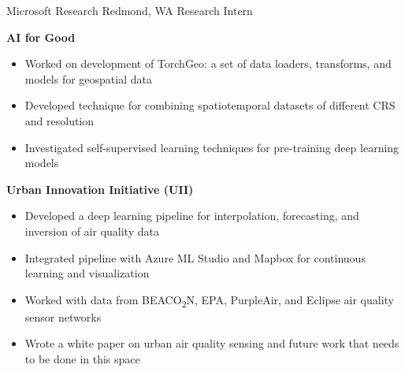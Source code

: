 
        {Microsoft Research}
        {Redmond, WA}
        {Research Intern}
        {}{
    \textbf{AI for Good}
    \begin{itemize}
        \item Worked on development of TorchGeo: a set of data loaders, transforms, and models for geospatial data
        \item Developed technique for combining spatiotemporal datasets of different CRS and resolution
        \item Investigated self-supervised learning techniques for pre-training deep learning models
    \end{itemize}
    \textbf{Urban Innovation Initiative (UII)}
    \begin{itemize}
        \item Developed a deep learning pipeline for interpolation, forecasting, and inversion of air quality data
        \item Integrated pipeline with Azure ML Studio and Mapbox for continuous learning and visualization
        \item Worked with data from BEACO\textsubscript{2}N, EPA, PurpleAir, and Eclipse air quality sensor networks
        \item Wrote a white paper on urban air quality sensing and future work that needs to be done in this space
    \end{itemize}
}
